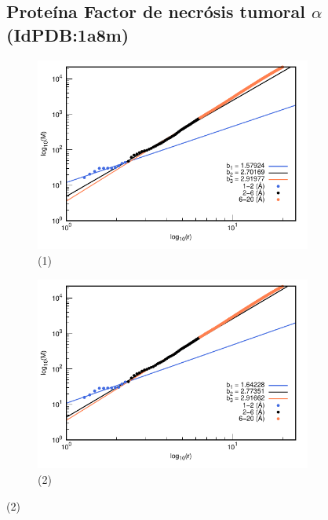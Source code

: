 \begin{figure}[H]
	\subsection*{Proteína Factor de necr\'{o}sis tumoral $\alpha$ (IdPDB:1a8m)}
	
	\hspace{-0.3cm} 
	\begin{subfigure}{0.49\textwidth}
		\centering
		\includegraphics[width=\linewidth,page=1]{graphs/PDBs/1a8m/1a8maddH.pdf}
		\caption{(1)}
	\end{subfigure}
	\hspace{0.2cm}
	\begin{subfigure}{0.49\textwidth}
		\centering
		\includegraphics[width=\linewidth,page=1]{graphs/PDBs/1a8m/1a8mEm.pdf}
		\caption{(2)}
	\end{subfigure}
	

\end{figure}
